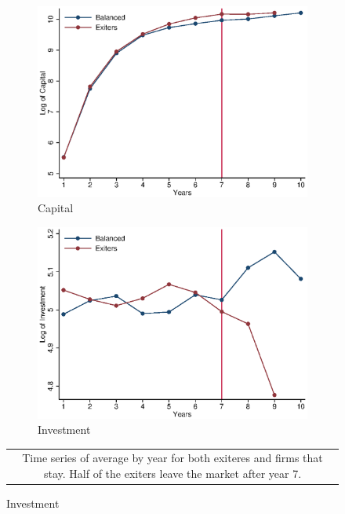 \documentclass[11pt]{article}
\begin{document}
\begin{figure}[ht]
\begin{subfigure}[b]{.3\textwidth}
	\end{subfigure}\\
	\begin{subfigure}[b]{.3\textwidth}
		\centering
		\caption{Capital}
		\includegraphics[width=\textwidth]{timeK.eps}
	\end{subfigure}
	\begin{subfigure}[b]{.3\textwidth}
		\centering
		\caption{Investment}
		\includegraphics[width=\textwidth]{timeI.eps}

	\end{subfigure}
\begin{tabular*}{1\textwidth}{c}
	\multicolumn{1}{p{1\hsize}}{\footnotesize Time series of average by year for both exiteres and firms that stay. Half of the exiters leave the market after year 7.}\\
\end{tabular*}      	  
\end{figure}
\end{document}
